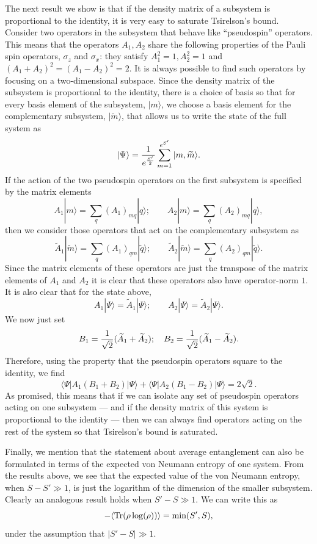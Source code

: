 \documentclass[12pt]{article}
\def\tr{{\rm Tr}}
\newcommand{\be}{\begin{equation}}
\newcommand{\ee}{\end{equation}}
\begin{document}
The next result we show is that if the density matrix of a subsystem is proportional to the identity, it is very easy to saturate Tsirelson's bound.  Consider  two operators in the  subsystem that behave like ``pseudospin'' operators. This means that the operators $A_1, A_2$ share the following properties of the Pauli spin operators, $\sigma_z$ and $\sigma_x$: they satisfy  $A_1^2 = 1, A_2^2 = 1$ and $(A_1 + A_2)^2 = (A_1 - A_2)^2 = 2$.  It is always possible to find such operators by focusing on a two-dimensional subspace. Since the density matrix of the subsystem is proportional to the identity, there is  a choice of basis so that for every basis element of the subsystem, $|m \rangle$, we choose a basis element for the complementary subsystem, $|\widetilde{m} \rangle$, that allows us to write the state of the full system as
\be
|\Psi \rangle = {1 \over e^{S' \over 2}}\sum_{m=1}^{e^{S'}}|m , \widetilde{m} \rangle.
\ee
If the action of the two pseudospin operators on the first subsystem is specified by the matrix elements
\be
A_1 |m \rangle = \sum_q (A_1)_{m q} |q \rangle; \qquad A_2 |m \rangle = \sum_q (A_2)_{m q} |q \rangle,
\ee
then we consider those operators that act on the complementary subsystem as 
\be
\widetilde{A}_1 |\widetilde{m} \rangle = \sum_{q} (A_1)_{q m} |\widetilde{q} \rangle; \qquad \widetilde{A}_2 |\widetilde{m} \rangle = \sum_{q} (A_2)_{q m} |\widetilde{q} \rangle.
\ee
Since the matrix elements of these operators are just the transpose of the matrix elements of $A_1$ and $A_2$ it is clear that these operators also have operator-norm $1$. 
It is also clear that for the state above,
\be
A_1 | \Psi \rangle = \widetilde{A}_1 |\Psi \rangle; \qquad A_2 | \Psi \rangle = \widetilde{A}_2 |\Psi \rangle.
\ee
We now just set
\be
B_1 = {1 \over \sqrt{2}} (\widetilde{A}_1 + \widetilde{A}_2); \quad B_2 = {1 \over \sqrt{2}} (\widetilde{A}_1 - \widetilde{A}_2).
\ee
Therefore, using the property that the pseudospin operators square to the identity, we find
\be
\langle \Psi| A_1 (B_1 + B_2) |\Psi \rangle + \langle \Psi | A_2 (B_1 - B_2) |\Psi \rangle = 2 \sqrt{2}.
\ee
As promised, this means that if we can isolate any set of pseudospin operators acting on one subsystem --- and if the density matrix of this system is proportional to the identity --- then we can always find operators 
acting on the rest of the system so that Tsirelson's bound is saturated.



Finally, we mention that the statement about average entanglement can also be formulated in terms of the expected von Neumann entropy of one system. From the results above, we see that the expected value of the von Neumann entropy, when $S - S' \gg 1$, is just the logarithm of the dimension of the smaller subsystem.  Clearly an analogous result holds when $S' - S \gg 1$.  We can write this as
\be
-\langle \tr(\rho \log (\rho)) \rangle = \text{min}(S', S),
\ee
under the assumption that $|S' - S| \gg 1$. 
\end{document}
